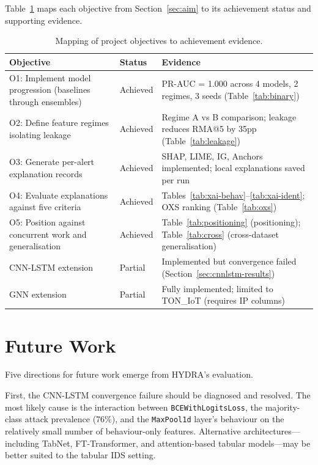 \documentclass[12pt,a4paper]{report}
\begin{document}
Table~\ref{tab:obj-achievement} maps each objective from Section~\ref{sec:aim} to its achievement status and supporting evidence.

\begin{table}[H]
\centering
\caption{Mapping of project objectives to achievement evidence.}
\label{tab:obj-achievement}
\small
\begin{tabular}{p{}lp{}}
\toprule
\textbf{Objective} & \textbf{Status} & \textbf{Evidence} \\
\midrule
O1: Implement model progression (baselines through ensembles) & Achieved & PR-AUC = 1.000 across 4 models, 2 regimes, 3 seeds (Table~\ref{tab:binary}) \\
\addlinespace
O2: Define feature regimes isolating leakage & Achieved & Regime A vs B comparison; leakage reduces RMA@5 by 35pp (Table~\ref{tab:leakage}) \\
\addlinespace
O3: Generate per-alert explanation records & Achieved & SHAP, LIME, IG, Anchors implemented; local explanations saved per run \\
\addlinespace
O4: Evaluate explanations against five criteria & Achieved & Tables~\ref{tab:xai-behav}--\ref{tab:xai-ident}; OXS ranking (Table~\ref{tab:oxs}) \\
\addlinespace
O5: Position against concurrent work and generalisation & Achieved & Table~\ref{tab:positioning} (positioning); Table~\ref{tab:cross} (cross-dataset generalisation) \\
\addlinespace
CNN-LSTM extension & Partial & Implemented but convergence failed (Section~\ref{sec:cnnlstm-results}) \\
\addlinespace
GNN extension & Partial & Fully implemented; limited to TON\_IoT (requires IP columns) \\
\bottomrule
\end{tabular}
\end{table}

\section{Future Work}
\label{sec:future}

Five directions for future work emerge from HYDRA's evaluation.

First, the CNN-LSTM convergence failure should be diagnosed and resolved. The most likely cause is the interaction between \texttt{BCEWithLogitsLoss}, the majority-class attack prevalence (76\%), and the \texttt{MaxPool1d} layer's behaviour on the relatively small number of behaviour-only features. Alternative architectures---including TabNet, FT-Transformer, and attention-based tabular models---may be better suited to the tabular IDS setting.
\end{document}
